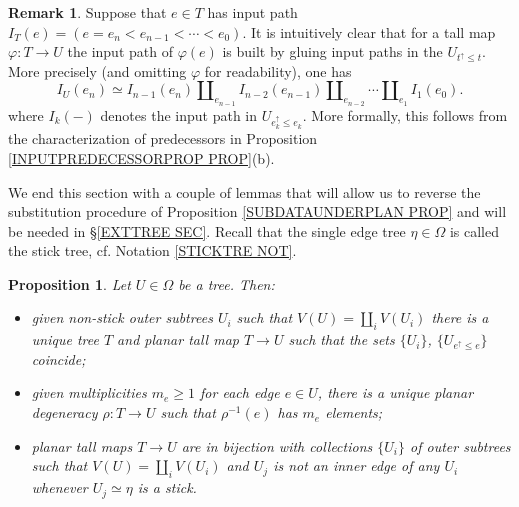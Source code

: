 \documentclass[a4paper,10pt
,draft
]{article}%
\numberwithin{equation}{section}
\numberwithin{figure}{section}
\newtheorem{proposition}[equation]{Proposition}%
\theoremstyle{definition} %
\newtheorem{remark}[equation]{Remark}%
\newcommand{\1}{\ensuremath{\mathbbm 1}}%
\begin{document}
\begin{remark}\label{INPPATH REM}
Suppose that $e \in T$ has input path
$I_T(e) = (e=e_n < e_{n-1} < \cdots < e_0)$.
It is intuitively clear that for a tall map 
$\varphi \colon T \to U$ the input path of $\varphi(e)$ is built by gluing input paths in the $U_{t^{\uparrow} \leq t}$. More precisely (and omitting $\varphi$ for readability), one has
\[
	I_U\left(e_n \right) \simeq 
	I_{n-1}(e_n) \amalg_{e_{n-1}} I_{n-2}(e_{n-1})
	\amalg_{e_{n-2}} \cdots
	\amalg_{e_1} I_1(e_0).
\]
where $I_k(\minus)$ denotes the input path in $U_{e_k^{\uparrow} \leq e_k}$.
More formally, this follows from the characterization of 
predecessors in Proposition \ref{INPUTPREDECESSORPROP PROP}(b).
\end{remark}


We end this section with a couple of lemmas that will allow us to reverse the substitution procedure of 
Proposition \ref{SUBDATAUNDERPLAN PROP}
and will be needed in \S \ref{EXTTREE SEC}.
Recall that the single edge tree $\eta \in \Omega$ is called the stick tree,
cf. Notation \ref{STICKTRE NOT}.

\begin{proposition}\label{BUILDABLE PROP}
	Let $U \in \Omega$ be a tree. Then:
\begin{itemize}
	\item[(i)] given non-stick outer subtrees $U_i$ such that 
	$V(U) = \coprod_i V(U_i)$ there is a unique tree $T$ and planar tall map $T \to U$ such that the sets $\{U_i\}$, $\{U_{e^{\uparrow}\leq e}\}$ coincide;
	\item[(ii)] given multiplicities $m_e \geq 1$ for each edge $e \in U$, there is a unique planar degeneracy $\rho \colon T \to U$ such that $\rho^{-1}(e)$ has $m_e$ elements;
	\item[(iii)] planar tall maps $T \to U$ are in bijection with collections $\{U_i\}$ of outer subtrees such that $V(U) = \coprod_i V(U_i)$ and $U_j$ is not an inner edge of any $U_i$ whenever $U_j \simeq \eta$ is a stick.
\end{itemize}
\end{proposition}
\end{document}
